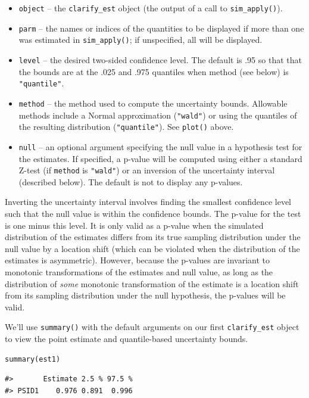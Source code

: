 \begin{itemize}
\item
  \texttt{object} -- the \texttt{clarify\_est} object (the output of a call to \texttt{sim\_apply()}).
\item
  \texttt{parm} -- the names or indices of the quantities to be displayed if more than one was estimated in \texttt{sim\_apply()}; if unspecified, all will be displayed.
\item
  \texttt{level} -- the desired two-sided confidence level. The default is .95 so that that the bounds are at the .025 and .975 quantiles when method (see below) is \texttt{"quantile"}.
\item
  \texttt{method} -- the method used to compute the uncertainty bounds. Allowable methods include a Normal approximation (\texttt{"wald"}) or using the quantiles of the resulting distribution (\texttt{"quantile"}). See \texttt{plot()} above.
\item
  \texttt{null} -- an optional argument specifying the null value in a hypothesis test for the estimates. If specified, a p-value will be computed using either a standard Z-test (if \texttt{method} is \texttt{"wald"}) or an inversion of the uncertainty interval (described below). The default is not to display any p-values.
\end{itemize}

Inverting the uncertainty interval involves finding the smallest confidence level such that the null value is within the confidence bounds. The p-value for the test is one minus this level. It is only valid as a p-value when the simulated distribution of the estimates differs from its true sampling distribution under the null value by a location shift (which can be violated when the distribution of the estimates is asymmetric). However, because the p-values are invariant to monotonic transformations of the estimates and null value, as long as the distribution of \emph{some} monotonic transformation of the estimate is a location shift from its sampling distribution under the null hypothesis, the p-values will be valid.

We'll use \texttt{summary()} with the default arguments on our first \texttt{clarify\_est} object to view the point estimate and quantile-based uncertainty bounds.

\begin{verbatim}
summary(est1)
\end{verbatim}

\begin{verbatim}
#>       Estimate 2.5 % 97.5 %
#> PSID1    0.976 0.891  0.996
\end{verbatim}

